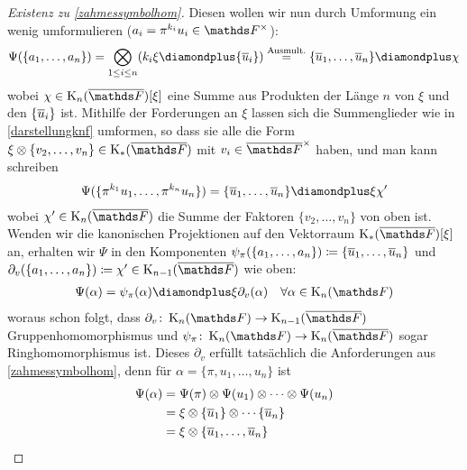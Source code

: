 \documentclass[ngerman,fontsize=11pt, paper=a4, parskip=half, titlepage=true, toc=bib]{scrartcl}
\begin{document}
\begin{proof}[Existenz zu \ref{zahmessymbolhom}]
  Diesen wollen wir nun durch Umformung ein wenig umformulieren
  ($a_i=\pi^{k_i}u_i\in\Fx$):
  \begin{gather*}
    \Psi(\{a_1,\dotsc,a_n\})
    =\bigotimes_{1\leq i\leq n}(k_i\xi\p\{\ov u_i\})
    \overset{\text{Ausmult.}}{=}
    \{\ov u_1,\dotsc,\ov u_n\}\p \chi
  \end{gather*}
  wobei $\chi\in\KnbF[\xi]$ eine Summe aus Produkten der Länge $n$ 
  von $\xi$ und den $\{\overline u_i\}$ ist.
  Mithilfe der Forderungen an $\xi$  lassen sich die Summenglieder 
  wie in \ref{darstellungknf} umformen, so dass sie alle die Form
  $\xi\otimes\{v_2,\dotsc, v_n\}\in\KbF$ mit $v_i\in\bFx$
  haben,
  und man kann schreiben
  \begin{gather*}
    \Psi(\{\pi^{k_1}u_1,\dotsc,\pi^{k_n}u_n\}) 
    = \{\ov u_1,\dotsc,\ov u_n\}\p \xi\chi'
  \end{gather*}
  wobei $\chi'\in\KnbF$ die Summe der Faktoren $\{v_2,\dotsc,v_n\}$
  von oben ist.
  Wenden wir die kanonischen Projektionen auf den Vektorraum 
  $\KbF[\xi]$ an, erhalten wir $\Psi$ in den Komponenten
  $\psi_\pi(\{a_1,\dotsc,a_n\})\coloneqq \{\overline u_1,\dotsc,\overline u_n\}$
  und $\partial_v(\{a_1,\dotsc,a_n\})\coloneqq \chi'\in\K_{n-1}(\bF)$ wie oben:
  \begin{gather*}
    \Psi(\alpha) = \psi_\pi(\alpha)\p \xi\partial_v(\alpha)
    \quad \forall\alpha\in\KnF
  \end{gather*}
  woraus schon folgt, 
  dass $\partial_v\colon\KnF\to\K_{n-1}(\bF)$ Gruppenhomomorphismus 
  und $\psi_\pi\colon\KnF\to\KnbF$ sogar Ringhomomorphismus ist.
  Dieses $\partial_v$ erfüllt tatsächlich die Anforderungen aus 
  \ref{zahmessymbolhom}, denn für $\alpha=\{\pi,u_1,\dotsc, u_n\}$ ist
  \begin{align*}
    \Psi(\alpha)
    &=\Psi(\pi)\otimes\Psi(u_1)\otimes\dotsb\otimes\Psi(u_n)\\
    &=\xi\otimes\{\ov u_1\}\otimes\dotsb\{\ov u_n\}\\
    &=\xi\otimes\{\ov u_1,\dotsc,\ov u_n\}\\

\end{align*}
\end{proof}
\end{document}
